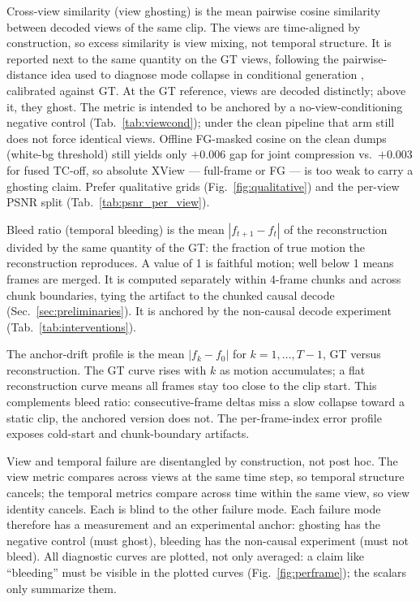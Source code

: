 Cross-view similarity (view ghosting) is the mean pairwise cosine similarity between decoded views of the same clip. The views are time-aligned by construction, so excess similarity is view mixing, not temporal structure. It is reported next to the same quantity on the GT views, following the pairwise-distance idea used to diagnose mode collapse in conditional generation \cite{zhu2017toward}, calibrated against GT. At the GT reference, views are decoded distinctly; above it, they ghost. The metric is intended to be anchored by a no-view-conditioning negative control (Tab.~\ref{tab:viewcond}); under the clean pipeline that arm still does not force identical views. Offline FG-masked cosine on the clean dumps (white-bg threshold) still yields only ${+}0.006$ gap for joint compression vs.\ ${+}0.003$ for fused TC-off, so absolute XView --- full-frame or FG --- is too weak to carry a ghosting claim. Prefer qualitative grids (Fig.~\ref{fig:qualitative}) and the per-view PSNR split (Tab.~\ref{tab:psnr_per_view}).

Bleed ratio (temporal bleeding) is the mean $|f_{t+1}-f_t|$ of the reconstruction divided by the same quantity of the GT: the fraction of true motion the reconstruction reproduces. A value of 1 is faithful motion; well below 1 means frames are merged. It is computed separately within 4-frame chunks and across chunk boundaries, tying the artifact to the chunked causal decode (Sec.~\ref{sec:preliminaries}). It is anchored by the non-causal decode experiment (Tab.~\ref{tab:interventions}).

The anchor-drift profile is the mean $|f_k-f_0|$ for $k=1,\ldots,T{-}1$, GT versus reconstruction. The GT curve rises with $k$ as motion accumulates; a flat reconstruction curve means all frames stay too close to the clip start. This complements bleed ratio: consecutive-frame deltas miss a slow collapse toward a static clip, the anchored version does not. The per-frame-index error profile exposes cold-start and chunk-boundary artifacts.

View and temporal failure are disentangled by construction, not post hoc. The view metric compares across views at the same time step, so temporal structure cancels; the temporal metrics compare across time within the same view, so view identity cancels. Each is blind to the other failure mode. Each failure mode therefore has a measurement and an experimental anchor: ghosting has the negative control (must ghost), bleeding has the non-causal experiment (must not bleed). All diagnostic curves are plotted, not only averaged: a claim like ``bleeding'' must be visible in the plotted curves (Fig.~\ref{fig:perframe}); the scalars only summarize them.

